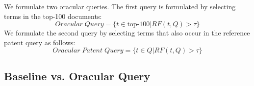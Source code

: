 
%

We formulate two oracular queries. The first query is formulated by selecting terms in the top-100 documents:
\begin{equation}
Oracular \; Query = \{t \in \textrm{top-100}|RF(t, Q)>\tau\}   
 \label{eq:score}
\end{equation}
We formulate the second query by selecting terms that also occur in the reference patent query as follows:
\begin{equation}
 Oracular \; Patent \; Query = \{t\in Q|RF(t, Q)>\tau\}   
 \label{eq:score}
\end{equation}

\subsection{Baseline vs. Oracular Query}

\label{sec:baseline_vs_oracular}

